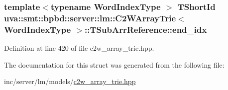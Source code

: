 \subsubsection[{end\+\_\+idx}]{\setlength{\rightskip}{0pt plus 5cm}template$<$typename Word\+Index\+Type $>$ {\bf T\+Short\+Id} {\bf uva\+::smt\+::bpbd\+::server\+::lm\+::\+C2\+W\+Array\+Trie}$<$ {\bf Word\+Index\+Type} $>$\+::T\+Sub\+Arr\+Reference\+::end\+\_\+idx}\label{structuva_1_1smt_1_1bpbd_1_1server_1_1lm_1_1_c2_w_array_trie_1_1_t_sub_arr_reference_ad05a303eb8f2a85b958a2f7b775d534a}


Definition at line 420 of file c2w\+\_\+array\+\_\+trie.\+hpp.



The documentation for this struct was generated from the following file\+:\begin{DoxyCompactItemize}
\item 
inc/server/lm/models/\hyperlink{c2w__array__trie_8hpp}{c2w\+\_\+array\+\_\+trie.\+hpp}\end{DoxyCompactItemize}

